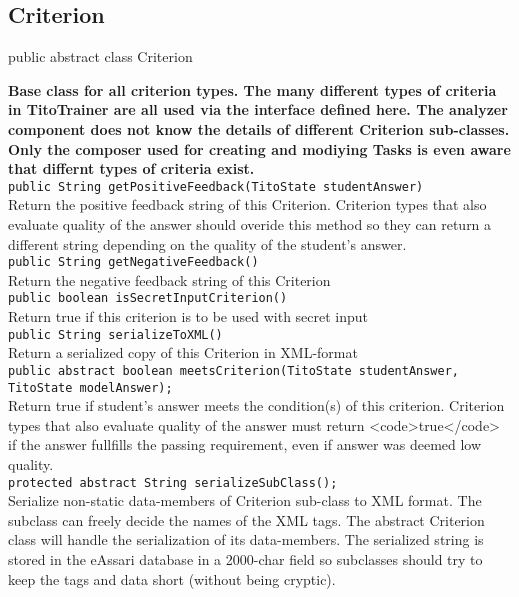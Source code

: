 \subsection{Criterion}
public abstract class Criterion

{\bf Base class for all criterion types. The many different types of criteria in TitoTrainer
are all used via the interface defined here. The analyzer component does not know the
details of different Criterion sub-classes. Only the composer used for creating and
modiying Tasks is even aware that differnt types of criteria exist.}\\

{\tt 	public String getPositiveFeedback(TitoState studentAnswer)} \\
Return the positive feedback string of this Criterion. Criterion types that also
evaluate quality of the answer should overide this method so they can return a 
different string depending on the quality of the student's answer.\\

{\tt 	public String getNegativeFeedback()} \\
Return the negative feedback string of this Criterion \\

{\tt 	public boolean isSecretInputCriterion()} \\
 Return true if this criterion is to be used with secret input \\

{\tt 	public String serializeToXML()} \\
Return a serialized copy of this Criterion in XML-format \\
		
{\tt 	public abstract boolean meetsCriterion(TitoState studentAnswer, TitoState modelAnswer);} \\
Return true if student's answer meets the condition(s) of this criterion. Criterion
types that also evaluate quality of the answer must return <code>true</code> if the 
answer fullfills the passing requirement, even if answer was deemed low quality. \\

{\tt 	protected abstract String serializeSubClass();} \\
Serialize non-static data-members of Criterion sub-class to XML format. The subclass
can freely decide the names of the XML tags. The abstract Criterion class will handle
the serialization of its data-members. The serialized string is stored in the eAssari database in a 2000-char field so
subclasses should try to keep the tags and data short (without being cryptic). \\
	
